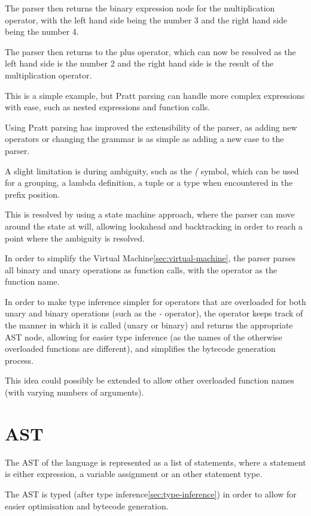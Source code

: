 The parser then returns the binary expression node for the multiplication operator, with the left hand side being
the number 3 and the right hand side being the number 4.

The parser then returns to the plus operator, which can now be resolved as the left hand side is the number 2 and the
right hand side is the result of the multiplication operator.

This is a simple example, but Pratt parsing can handle more complex expressions with ease, such as nested
expressions and function calls.

Using Pratt parsing has improved the extensibility of the parser, as adding new operators or changing the grammar
is as simple as adding a new case to the parser.

A slight limitation is during ambiguity, such as the \textit{(} symbol, which can be used for a grouping, a lambda 
definition, a tuple or a  type when encountered in the prefix position.

This is resolved by using a state machine approach, where the parser can move around the state at will, allowing 
lookahead and backtracking in order to reach a point where the ambiguity is resolved.

In order to simplify the Virtual Machine\ref{sec:virtual-machine}, the parser parses all binary and unary operations 
as function calls, with the operator as the function name.

In order to make type inference simpler for operators that are overloaded for both unary and binary operations (such 
as the \textit{-} operator), the operator keeps track of the manner in which it is called (unary or binary) and
returns the appropriate AST node, allowing for easier type inference (as the names of the otherwise overloaded 
functions are different), and simplifies the bytecode generation process.

This idea could possibly be extended to allow other overloaded function names (with varying numbers of arguments).

\section{AST}\label{sec:expression}

The AST of the language is represented as a list of statements, where a statement is either expression, a
variable assignment or an other statement type.

The AST is typed (after type inference\ref{sec:type-inference}) in order to allow for easier optimisation and
bytecode generation.

